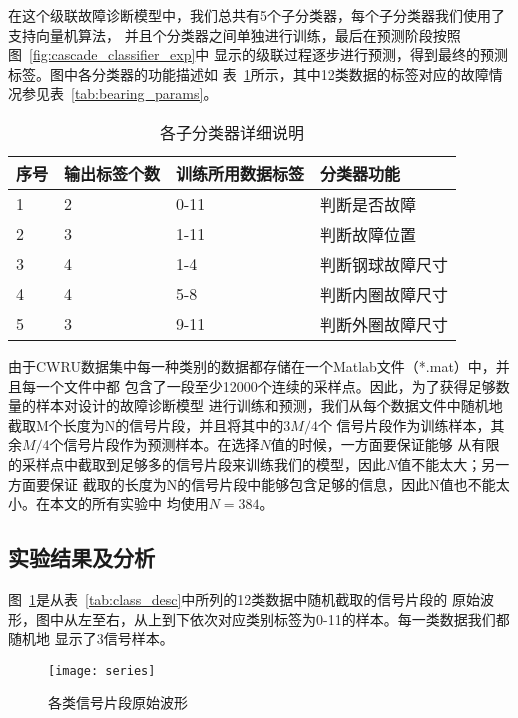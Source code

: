 在这个级联故障诊断模型中，我们总共有5个子分类器，每个子分类器我们使用了支持向量机算法，
并且个分类器之间单独进行训练，最后在预测阶段按照图~\ref{fig:cascade_classifier_exp}中
显示的级联过程逐步进行预测，得到最终的预测标签。图中各分类器的功能描述如
表~\ref{tab:classifier_desc}所示，其中12类数据的标签对应的故障情况参见表~\ref{tab:bearing_params}。
\begin{table}[htb]
  \centering
  \begin{minipage}[t]{0.8\linewidth} %
  \caption{各子分类器详细说明}
  \label{tab:classifier_desc}
    \begin{tabularx}{\linewidth}{lXXX}
      \toprule[1.5pt]
      序号 & 输出标签个数 & 训练所用数据标签 & 分类器功能 \\\midrule[1pt]
      1 & 2 & 0-11 & 判断是否故障\\
      2 & 3 & 1-11 & 判断故障位置\\
      3 & 4 & 1-4 & 判断钢球故障尺寸\\
      4 & 4 & 5-8 & 判断内圈故障尺寸\\
      5 & 3 & 9-11 & 判断外圈故障尺寸\\
      \bottomrule[1.5pt]
    \end{tabularx}
  \end{minipage}
\end{table}

由于CWRU数据集中每一种类别的数据都存储在一个Matlab文件（*.mat）中，并且每一个文件中都
包含了一段至少12000个连续的采样点。因此，为了获得足够数量的样本对设计的故障诊断模型
进行训练和预测，我们从每个数据文件中随机地截取M个长度为N的信号片段，并且将其中的$3M/4$个
信号片段作为训练样本，其余$M/4$个信号片段作为预测样本。在选择$N$值的时候，一方面要保证能够
从有限的采样点中截取到足够多的信号片段来训练我们的模型，因此$N$值不能太大；另一方面要保证
截取的长度为N的信号片段中能够包含足够的信息，因此N值也不能太小。在本文的所有实验中
均使用$N=384$。

\subsection{实验结果及分析}
\label{subsection:cascade_result}

图~\ref{fig:series}是从表~\ref{tab:class_desc}中所列的12类数据中随机截取的信号片段的
原始波形，图中从左至右，从上到下依次对应类别标签为0-11的样本。每一类数据我们都随机地
显示了3信号样本。
\begin{figure}[ht] %
  \centering
  \texttt{[image: series]}
  \caption{各类信号片段原始波形}
  \label{fig:series}
\end{figure}

